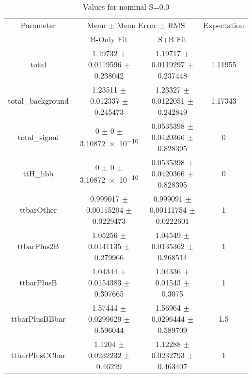 \begin{table}
\centering
\caption{Values for nominal S=0.0}
\begin{tabular}{cccc}
\toprule
Parameter & \multicolumn{2}{c}{Mean $\pm$ Mean Error $\pm$ RMS} & Expectation\\
 & B-Only Fit & S+B Fit & \\
\midrule
total & \num{1.19732} $\pm$ \num{0.0119596} $\pm$ \num{0.238042} & \num{1.19717} $\pm$ \num{0.0119297} $\pm$ \num{0.237448} & \num{1.11955}\\
total\_background & \num{1.23511} $\pm$ \num{0.012337} $\pm$ \num{0.245473} & \num{1.23327} $\pm$ \num{0.0122051} $\pm$ \num{0.242849} & \num{1.17343}\\
total\_signal & \num{0} $\pm$ \num{0} $\pm$ \num{3.10872e-10} & \num{0.0535398} $\pm$ \num{0.0420366} $\pm$ \num{0.828395} & \num{0}\\
ttH\_hbb & \num{0} $\pm$ \num{0} $\pm$ \num{3.10872e-10} & \num{0.0535398} $\pm$ \num{0.0420366} $\pm$ \num{0.828395} & \num{0}\\
ttbarOther & \num{0.999017} $\pm$ \num{0.00115204} $\pm$ \num{0.0229473} & \num{0.999091} $\pm$ \num{0.00111754} $\pm$ \num{0.0222601} & \num{1}\\
ttbarPlus2B & \num{1.05256} $\pm$ \num{0.0141135} $\pm$ \num{0.279966} & \num{1.04549} $\pm$ \num{0.0135362} $\pm$ \num{0.268514} & \num{1}\\
ttbarPlusB & \num{1.04344} $\pm$ \num{0.0154383} $\pm$ \num{0.307665} & \num{1.04336} $\pm$ \num{0.01543} $\pm$ \num{0.3075} & \num{1}\\
ttbarPlusBBbar & \num{1.57444} $\pm$ \num{0.0299629} $\pm$ \num{0.596044} & \num{1.56964} $\pm$ \num{0.0296444} $\pm$ \num{0.589709} & \num{1.5}\\
ttbarPlusCCbar & \num{1.1204} $\pm$ \num{0.0232232} $\pm$ \num{0.46229} & \num{1.12288} $\pm$ \num{0.0232793} $\pm$ \num{0.463407} & \num{1}\\
\bottomrule
\end{tabular}
\end{table}